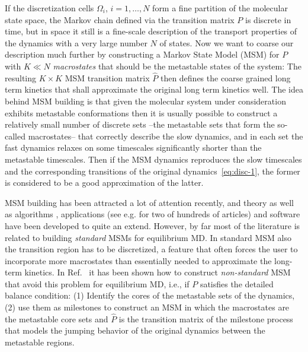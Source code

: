 \documentclass[aps, pre, preprint,unsortedaddress,a4paper,onecolumn,showkeys]{revtex4}
\newcommand{\vect}[1]{#1}
\begin{document}
If the discretization cells $\Omega_i$, $i=1,\ldots,N$ form a fine
partition of the molecular state space, the Markov chain defined via
the transition matrix $P$
 is discrete in time, but in space it still is a fine-scale description of the transport properties of the
dynamics with a very large number $N$ of states.  Now we want to coarse our description much further by
constructing a Markov State Model (MSM) for $\vect P$ with $K\ll N$
\emph{macrostates} that should be the metastable states of the system: The resulting $K\times K$ MSM transition matrix $\hat{\vect P}$
then defines the coarse grained long term kinetics that shall
approximate the original long term kinetics well. 
The idea behind MSM building is that given the molecular system under consideration exhibits metastable conformations then it is usually possible to construct a
relatively small number of discrete sets --the metastable sets that form the so-called macrostates-- that
correctly describe the slow  dynamics, and 
in each set the fast dynamics relaxes on some timescales significantly shorter than the metastable timescales.
Then if the MSM dynamics reproduces the slow timescales and the corresponding transitions
of the original dynamics~\eqref{eq:disc-1},
the former is considered to be a good approximation of the latter.

MSM building has been attracted a lot of attention recently, and theory  \cite{A19-31} as well as algorithms \cite{A19-1}, applications (see e.g. \cite{A19-26,PNAS09} for two of hundreds of articles) and software \cite{A19-49, MSMBuilder} have been developed to quite an extend. However, 
by far most of the literature is related to building \emph{standard} MSMs for equilibrium MD. In standard MSM also the transition region has to be discretized, a feature that often forces the user to incorporate more macrostates than essentially needed to approximate the long-term kinetics.
In Ref.~\cite{sarich2010approximation, A19-31,schuette2011markov,BucheteHummer} it has been shown how to construct \emph{non-standard} MSM that avoid this problem for equilibrium MD, i.e., if $\vect P$ satisfies the detailed balance
condition: (1) Identify the cores of the metastable sets of the
dynamics, (2) use them as milestones to construct an MSM in which the
macrostates are the metastable core sets and $\hat{\vect P}$ is the transition
matrix of the milestone process \cite{A19-31,schuette2011markov,A19-29} that models the jumping behavior of
the original dynamics between the metastable regions. 
\end{document}
